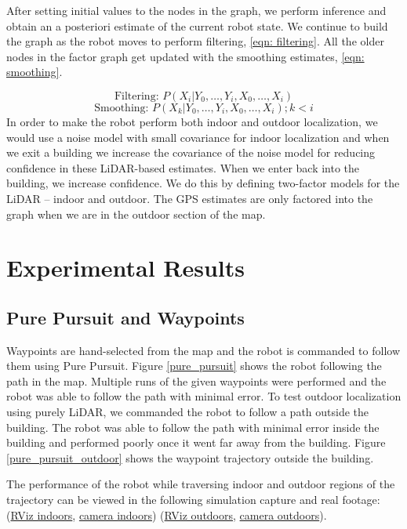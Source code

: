\documentclass[10pt, reqno, letterpaper, twoside]{amsart}
\begin{document}
After setting initial values to the nodes in the graph, we perform inference and obtain an a posteriori estimate of the current robot state. We continue to build the graph as the robot moves to perform filtering, \ref{eqn: filtering}. All the older nodes in the factor graph get updated with the smoothing estimates, \ref{eqn: smoothing}.

\begin{equation}
    \label{eqn: filtering}
    \text{Filtering: }P(X_i | Y_0, \dots , Y_i, X_0, \dots, X_i)
\end{equation}
\begin{equation}
    \label{eqn: smoothing}
    \text{Smoothing: }P(X_k | Y_0, \dots , Y_i, X_0, \dots, X_i); k<i
\end{equation}
In order to make the robot perform both indoor and outdoor localization, we would use a noise model with small covariance for indoor localization and when we exit a building we increase the covariance of the noise model for reducing confidence in these LiDAR-based estimates. When we enter back into the building, we increase confidence. We do this by defining two-factor models for the LiDAR – indoor and outdoor. The GPS estimates are only factored into the graph when we are in the outdoor section of the map.

\section{Experimental Results}

\subsection{Pure Pursuit and Waypoints}
Waypoints are hand-selected from the map and the robot is commanded to follow them using Pure Pursuit. Figure \ref{pure_pursuit} shows the robot following the path in the map. Multiple runs of the given waypoints were performed and the robot was able to follow the path with minimal error.
To test outdoor localization using purely LiDAR, we commanded the robot to follow a path outside the building. The robot was able to follow the path with minimal error inside the building and performed poorly once it went far away from the building. Figure \ref{pure_pursuit_outdoor} shows the  waypoint trajectory outside the building.

The performance of the robot while traversing indoor and outdoor regions of the trajectory can be viewed in the following simulation capture and real footage: (\href{https://drive.google.com/file/d/1S5dACtsnclNLarxH920A84mAjVBbkHSJ/view?usp=share_link}{RViz indoors}, \href{https://drive.google.com/file/d/1_K32a5YyUOGGNr-nXjuIZ-EI5aUw_gXX/view?usp=share_link}{camera indoors})
 (\href{https://drive.google.com/file/d/1MZhdwVj8nc3G_MShZj-Z2F_11WAOJ8Xa/view?usp=share_link}{RViz outdoors}, \href{https://drive.google.com/file/d/1QDAX6c1etOxoA3TyvnGu2bQftwHt8Psq/view?usp=share_link}{camera outdoors}).
\end{document}
